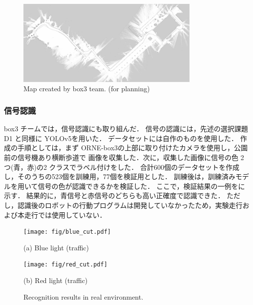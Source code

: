 \documentclass[twocolumn, 9pt]{jsproceedings}
\begin{document}
\begin{figure}[H]
  \centering
  \includegraphics[width=90mm]{fig/3-map.pdf}
  \caption{Map created by box3 team. (for planning)}
  \label{fig:3-map}
\end{figure}

\subsubsection{信号認識}
box3 チームでは，信号認識にも取り組んだ．
信号の認識には，先述の選択課題 D1 と同様に YOLOv5を用いた．
データセットには自作のものを使用した．
作成の手順としては，まず ORNE-box3の上部に取り付けたカメラを使用し，公園前の信号機あり横断歩道で
画像を収集した．次に，収集した画像に信号の色 2つ(青，赤)の2 クラスでラベル付けをした．
合計600個のデータセットを作成し，そのうちの523個を訓練用，77個を検証用とした．
訓練後は，訓練済みモデルを用いて信号の色が認識できるかを検証した．
ここで，検証結果の一例をに示す．
結果的に，青信号と赤信号のどちらも高い正確度で認識できた．
ただし，認識後のロボットの行動プログラムは開発していなかったため，実験走行および本走行では使用していない．


\begin{figure}[h!]
  \begin{minipage}[t]{0.47\linewidth}
    \centering
    \texttt{[image: fig/blue\_cut.pdf]}
    \caption*{(a) Blue light (traffic)}
  \end{minipage}
  \hspace*{2mm}
  \begin{minipage}[t]{0.47\linewidth}
    \centering
    \texttt{[image: fig/red\_cut.pdf]}
    \caption*{(b) Red light (traffic)}
  \end{minipage}
  \caption{Recognition results in real environment.}
  \label{fig:traffic}
\end{figure}
\end{document}
